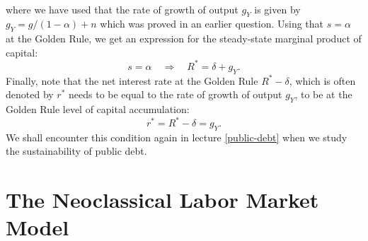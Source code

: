 \documentclass[]{book}
\begin{document}
\begin{enumerate}
\[\begin{aligned}
  \end{aligned}
  \] where we have used that the rate of growth of output \(g_Y\) is
  given by \(g_Y = g/(1-\alpha)+n\) which was proved in an earlier
  question. Using that \(s=\alpha\) at the Golden Rule, we get an
  expression for the steady-state marginal product of capital:
  \[s= \alpha \quad \Rightarrow \quad \boxed{R^{*} = \delta + g_Y}.\]
  Finally, note that the net interest rate at the Golden Rule
  \(R^{*}-\delta\), which is often denoted by \(r^{*}\) needs to be
  equal to the rate of growth of output \(g_Y\), to be at the Golden
  Rule level of capital accumulation:
  \[\boxed{r^{*}=R^{*}-\delta=g_Y}.\] We shall encounter this condition
  again in lecture \ref{public-debt} when we study the sustainability of
  public debt.
\end{enumerate}

\section{The Neoclassical Labor Market
Model}\label{the-neoclassical-labor-market-model-1}
\end{document}
